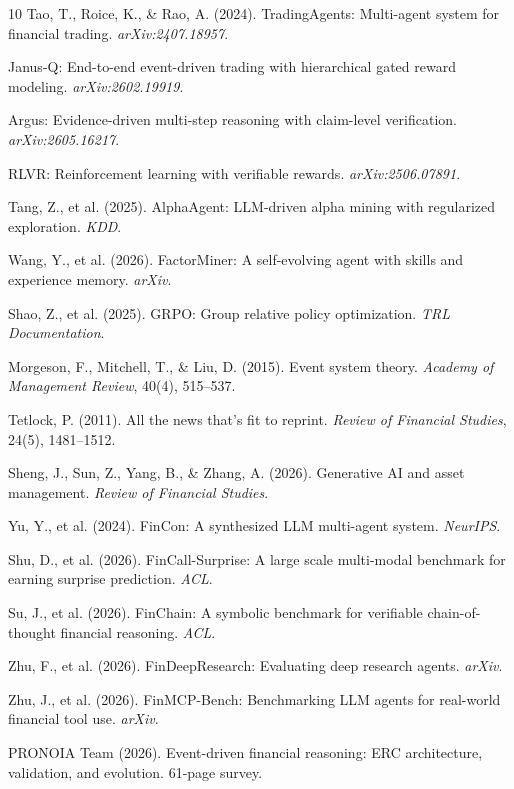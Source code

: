 \documentclass[sigconf, anonymous, review]{acmart}
\begin{document}
\begin{thebibliography}{10}
Tao, T., Roice, K., \& Rao, A. (2024). TradingAgents: Multi-agent system for financial trading. \emph{arXiv:2407.18957}.

Janus-Q: End-to-end event-driven trading with hierarchical gated reward modeling. \emph{arXiv:2602.19919}.

Argus: Evidence-driven multi-step reasoning with claim-level verification. \emph{arXiv:2605.16217}.

RLVR: Reinforcement learning with verifiable rewards. \emph{arXiv:2506.07891}.

Tang, Z., et al. (2025). AlphaAgent: LLM-driven alpha mining with regularized exploration. \emph{KDD}.

Wang, Y., et al. (2026). FactorMiner: A self-evolving agent with skills and experience memory. \emph{arXiv}.

Shao, Z., et al. (2025). GRPO: Group relative policy optimization. \emph{TRL Documentation}.

Morgeson, F., Mitchell, T., \& Liu, D. (2015). Event system theory. \emph{Academy of Management Review}, 40(4), 515--537.

Tetlock, P. (2011). All the news that's fit to reprint. \emph{Review of Financial Studies}, 24(5), 1481--1512.

Sheng, J., Sun, Z., Yang, B., \& Zhang, A. (2026). Generative AI and asset management. \emph{Review of Financial Studies}.

Yu, Y., et al. (2024). FinCon: A synthesized LLM multi-agent system. \emph{NeurIPS}.

Shu, D., et al. (2026). FinCall-Surprise: A large scale multi-modal benchmark for earning surprise prediction. \emph{ACL}.

Su, J., et al. (2026). FinChain: A symbolic benchmark for verifiable chain-of-thought financial reasoning. \emph{ACL}.

Zhu, F., et al. (2026). FinDeepResearch: Evaluating deep research agents. \emph{arXiv}.

Zhu, J., et al. (2026). FinMCP-Bench: Benchmarking LLM agents for real-world financial tool use. \emph{arXiv}.

PRONOIA Team (2026). Event-driven financial reasoning: ERC architecture, validation, and evolution. 61-page survey.

\end{thebibliography}
\end{document}
